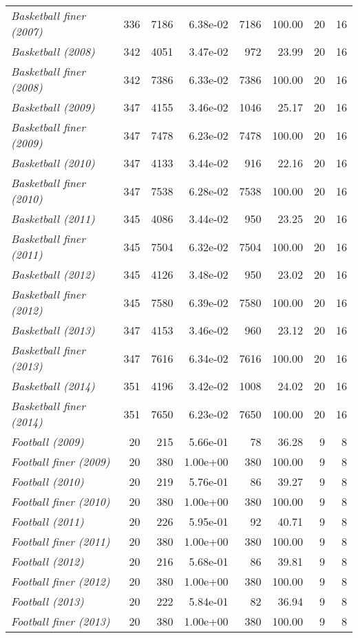 \documentclass[nohyperref]{article}
\theoremstyle{plain}
\theoremstyle{definition}
\theoremstyle{remark}
\begin{document}
\begin{table}[tb!]
{\begin{tabular}{lrrrrrrr}
\textit{Basketball finer (2007)}&336&7186&6.38e-02&7186&100.00&20&16\\
\textit{Basketball (2008)}&342&4051&3.47e-02&972&23.99&20&16\\
\textit{Basketball finer (2008)}&342&7386&6.33e-02&7386&100.00&20&16\\
\textit{Basketball (2009)}&347&4155&3.46e-02&1046&25.17&20&16\\
\textit{Basketball finer (2009)}&347&7478&6.23e-02&7478&100.00&20&16\\
\textit{Basketball (2010)}&347&4133&3.44e-02&916&22.16&20&16\\
\textit{Basketball finer (2010)}&347&7538&6.28e-02&7538&100.00&20&16\\
\textit{Basketball (2011)}&345&4086&3.44e-02&950&23.25&20&16\\
\textit{Basketball finer (2011)}&345&7504&6.32e-02&7504&100.00&20&16\\
\textit{Basketball (2012)}&345&4126&3.48e-02&950&23.02&20&16\\
\textit{Basketball finer (2012)}&345&7580&6.39e-02&7580&100.00&20&16\\
\textit{Basketball (2013)}&347&4153&3.46e-02&960&23.12&20&16\\
\textit{Basketball finer (2013)}&347&7616&6.34e-02&7616&100.00&20&16\\
\textit{Basketball (2014)}&351&4196&3.42e-02&1008&24.02&20&16\\
\textit{Basketball finer (2014)}&351&7650&6.23e-02&7650&100.00&20&16\\
\textit{Football (2009)}&20&215&5.66e-01&78&36.28&9&8\\
\textit{Football finer (2009)}&20&380&1.00e+00&380&100.00&9&8\\
\textit{Football (2010)}&20&219&5.76e-01&86&39.27&9&8\\
\textit{Football finer (2010)}&20&380&1.00e+00&380&100.00&9&8\\
\textit{Football (2011)}&20&226&5.95e-01&92&40.71&9&8\\
\textit{Football finer (2011)}&20&380&1.00e+00&380&100.00&9&8\\
\textit{Football (2012)}&20&216&5.68e-01&86&39.81&9&8\\
\textit{Football finer (2012)}&20&380&1.00e+00&380&100.00&9&8\\
\textit{Football (2013)}&20&222&5.84e-01&82&36.94&9&8\\
\textit{Football finer (2013)}&20&380&1.00e+00&380&100.00&9&8\\

\end{tabular}}
\end{table}
\end{document}
